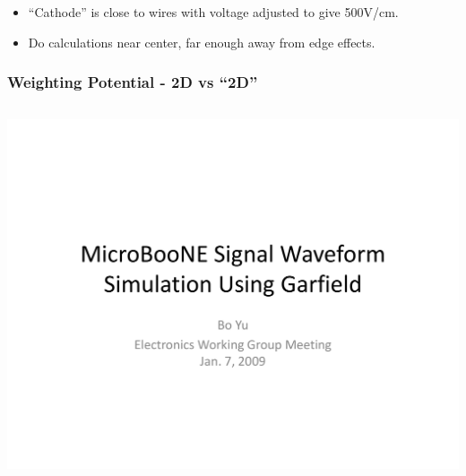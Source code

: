 \documentclass[xcolor=dvipsnames]{beamer}
\begin{document}
\begin{frame}
\begin{center}
    \begin{itemize}\footnotesize
    \item ``Cathode'' is close to wires with voltage adjusted to give 500V/cm.
    \item Do calculations near center, far enough away from edge effects.
    \end{itemize}
  \end{center}

\end{frame}


\begin{frame}
  \frametitle{Weighting Potential - 2D vs ``2D''}

  \vspace{-5mm}

  \begin{columns}
    \begin{column}{0.5\textwidth}
      \begin{center}
        \includegraphics[height=0.65\textheight,page=5,angle=-90,clip,trim=0 0 0 5mm]{GarfieldSimulation-BoYu.pdf}


\end{center}
\end{column}
\end{columns}
\end{frame}
\end{document}
